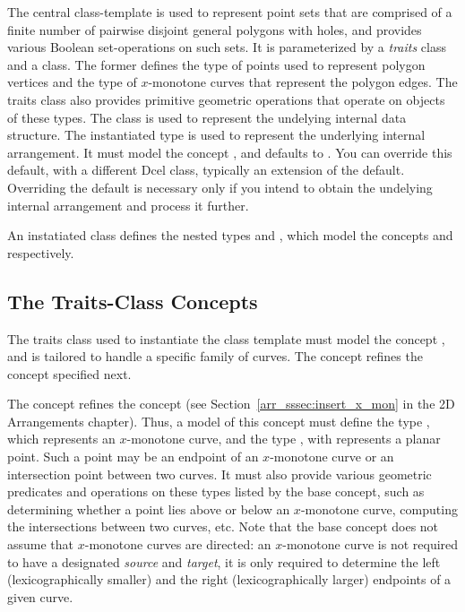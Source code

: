The central class-template  is 
used to represent point sets that are comprised of a finite number of 
pairwise disjoint general polygons with holes, and provides various 
Boolean set-operations on such sets. It is parameterized by a {\em traits}
class and a \dcel{} class. The former defines the type of points used 
to represent polygon vertices and the type of $x$-monotone curves that 
represent the polygon edges. The traits class also provides primitive 
geometric operations that operate on objects of these types. 
The \dcel{} class is used to represent the undelying internal 
 data structure. The instantiated  type is 
used to represent the underlying internal arrangement. It must model the 
concept , and defaults to .
You can override this default, with a different {\sc Dcel} class, typically
an extension of the default. Overriding the default is necessary only if 
you intend to obtain the undelying internal arrangement and process it further.

An instatiated
 class defines the nested types 
 and
, which model
the concepts  and
 respectively.

\subsection{The Traits-Class Concepts\label{bso_ssec:traits_concepts}}

The traits class used to instantiate the 
class template must model the concept ,
and is tailored to handle a specific family of curves. The concept
 refines the concept
 specified next.

The concept  refines the 
concept  (see 
Section~\ref{arr_sssec:insert_x_mon} in the 2D Arrangements chapter).
Thus, a model of this concept must define the type , 
which represents an $x$-monotone curve, and the type , 
with represents a planar point. Such a point may be an endpoint of an
$x$-monotone curve or an intersection point between two curves.
It must also provide various geometric predicates and operations 
on these types listed by the base concept, such as determining whether
a point lies above or below an $x$-monotone curve, computing the
intersections between two curves, etc. Note that the base concept does
not assume that $x$-monotone curves are directed: an $x$-monotone
curve is not required to have a designated {\em source} and {\em
target}, it is only required to determine the left (lexicographically
smaller) and the right (lexicographically larger) endpoints of a given
curve.

